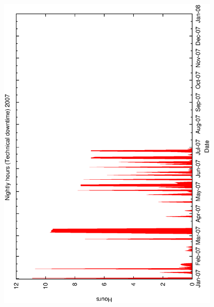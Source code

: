 \begin{figure}[h]
\begin{center}
{    \includegraphics[scale=0.4, angle=-90]{figures/met_nightly_stats_tech2007.eps}
  } 
\end{center}
\end{figure}
